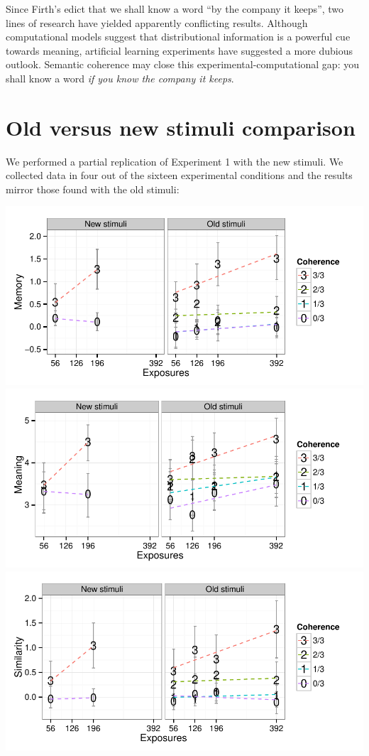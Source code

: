 \documentclass[man,floatsintext]{apa6}
\begin{document}
Since Firth's edict that we shall know a word ``by the company it keeps'', two lines of research have yielded apparently conflicting results. Although computational models suggest that distributional information is a powerful cue towards meaning, artificial learning experiments have suggested a more dubious outlook. Semantic coherence may close this experimental-computational gap: you shall know a word \emph{if you know the company it keeps}.

\newpage



\appendix
\section{Old versus new stimuli comparison}
\label{old-vs-new}

We performed a partial replication of Experiment 1 with the new stimuli. We collected data in four out of the sixteen experimental conditions and the results mirror those found with the old stimuli:

\begin{center}
\includegraphics[width=0.7\linewidth]{stim-comparison-mem} \\

\includegraphics[width=0.7\linewidth]{stim-comparison-mng} \\

\includegraphics[width=0.7\linewidth]{stim-comparison-sim}

\end{center}
\end{document}

